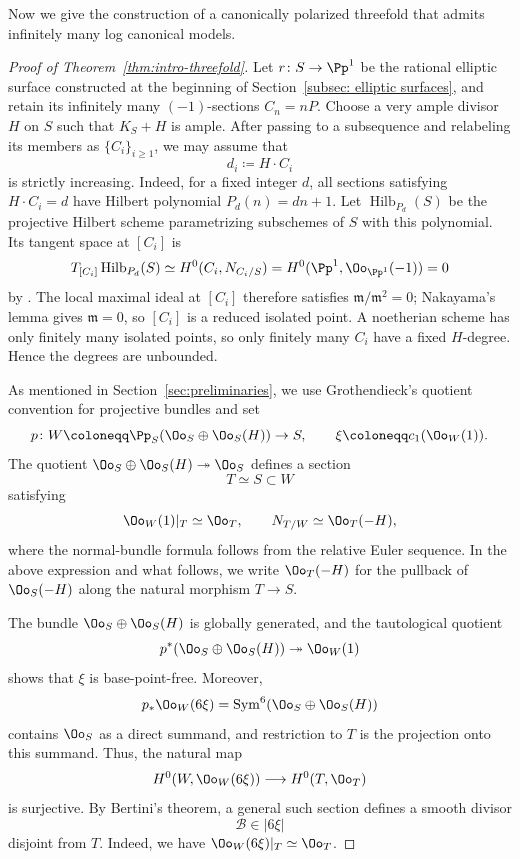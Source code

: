 \documentclass[12pt]{amsart}
\newcommand{\Sym}{\operatorname{Sym}}
\begin{document}
Now we give the construction of a canonically polarized threefold
that admits infinitely many log canonical models.


\begin{proof}[Proof of Theorem~\ref{thm:intro-threefold}]
Let $r\colon S\to\Pp^1$ be the rational elliptic surface constructed at
the beginning of Section~\ref{subsec: elliptic surfaces}, and retain its
infinitely many $(-1)$-sections $C_n=nP$. Choose a very ample divisor
$H$ on $S$ such that $K_S+H$ is ample. After passing to a subsequence
and relabeling its members as $\{C_i\}_{i\geq1}$, we may assume that
\begin{equation}\label{eq:di-increasing}
  d_i\coloneqq H\cdot C_i
\end{equation}
is strictly increasing. Indeed, for a fixed integer $d$, all sections satisfying $H\cdot C_i=d$ have Hilbert polynomial $P_d(n)=dn+1$. Let $\operatorname{Hilb}_{P_d}(S)$ be the projective Hilbert scheme parametrizing subschemes of $S$ with this polynomial. Its tangent space at $[C_i]$ is
\[
 T_{[C_i]}\operatorname{Hilb}_{P_d}(S)
 \simeq H^0(C_i,N_{C_i/S})
 =H^0(\Pp^1,\Oo_{\Pp^1}(-1))=0
\]
by \cite[Theorem~1.1(b)]{Har10}. The local maximal ideal at $[C_i]$ therefore satisfies $\mathfrak m/\mathfrak m^2=0$; Nakayama's lemma gives $\mathfrak m=0$, so $[C_i]$ is a reduced isolated point. A noetherian scheme has only finitely many isolated points, so only finitely many $C_i$ have a fixed $H$-degree. Hence the degrees are unbounded.

As mentioned in Section~\ref{sec:preliminaries}, we use Grothendieck's quotient convention for projective bundles and set
\[
 p\colon W\coloneqq\Pp_S(\Oo_S\oplus\Oo_S(H))\to S,
 \qquad
 \xi\coloneqq c_1(\Oo_W(1)).
\]
The quotient $\Oo_S\oplus\Oo_S(H)\twoheadrightarrow\Oo_S$ defines a section
\[
 T\simeq S\subset W
\]
satisfying
\begin{equation}\label{eq:T-normal}
 \Oo_W(1)|_T\simeq\Oo_T,
 \qquad
 N_{T/W}\simeq\Oo_T(-H),
\end{equation}
where the normal-bundle formula follows from the relative Euler sequence. In the above expression and what follows, we write $\Oo_T(-H)$ for the pullback of $\Oo_S(-H)$ along the natural morphism $T \to S$.

The bundle $\Oo_S\oplus\Oo_S(H)$ is globally generated, and the tautological quotient
\[
 p^*(\Oo_S\oplus\Oo_S(H))\twoheadrightarrow\Oo_W(1)
\]
shows that $\xi$ is base-point-free.
Moreover,
\[
 p_*\Oo_W(6\xi)
 =\Sym^6(\Oo_S\oplus\Oo_S(H))
\]
contains $\Oo_S$ as a direct summand, and restriction to $T$ is the projection onto this summand. Thus, the natural map
\[
 H^0(W,\Oo_W(6\xi))\longrightarrow H^0(T,\Oo_T)
\]
is surjective. 
By Bertini's theorem, a general such section defines a smooth divisor
\[
 \mathcal B\in|6\xi|
\]
disjoint from $T$. Indeed, we have $\Oo_W(6\xi)|_T\simeq\Oo_T$.


\end{proof}
\end{document}
